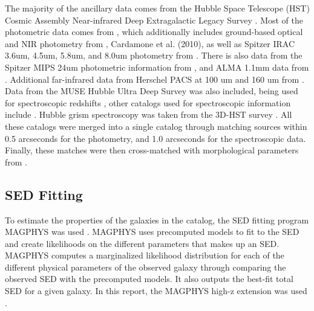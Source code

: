 The majority of the ancillary data comes from the Hubble Space Telescope (HST) Cosmic Assembly Near-infrared Deep Extragalactic Legacy Survey \cite{grogin2011candels, Koekemoer_2011}. Most of the photometric data comes from \cite{skelton20143d}, which additionally includes ground-based optical and NIR photometry from \cite{nonino2009deep, hildebrandt2006gabods, erben2005gabods, retzlaff2010great, Hsieh_2012, 2008ApJ...682..985W}, Cardamone et al. (2010), as well as Spitzer IRAC 3.6um, 4.5um, 5.8um, and 8.0um photometry from \cite{dickinson2003evolution, elbaz2011goods, 2013ApJ...769...80A}. There is also data from the Spitzer MIPS 24um photometric information from \cite{Whitaker_2014}, and ALMA 1.1mm data from \cite{franco2018goods}. Additional far-infrared data from Herschel PACS at 100 um and 160 um from \cite{elbaz2011goods}. Data from the MUSE Hubble Ultra Deep Survey \cite{bacon2017} was also included, being used for spectroscopic redshifts \cite{inami2017}, other catalogs used for spectroscopic information include \cite{le2005vimos, coe2006galaxies, skelton20143d, morris2015wfc3}. Hubble grism spectroscopy was taken from the 3D-HST survey \cite{momcheva20163d}.  All these catalogs were merged into a single catalog through matching sources within 0.5 arcseconds for the photometry, and 1.0 arcseconds for the spectroscopic data. Finally, these matches were then cross-matched with morphological parameters from \cite{van2012structural}.




\subsection{SED Fitting}

To estimate the properties of the galaxies in the catalog, the SED fitting program MAGPHYS was used \cite{da2008simple, da2015alma}. MAGPHYS uses precomputed models to fit to the SED and create likelihoods on the different parameters that makes up an SED. MAGPHYS computes a marginalized likelihood distribution for each of the different physical parameters of the observed galaxy through comparing the observed SED with the precomputed models. It also outputs the best-fit total SED for a given galaxy. In this report, the MAGPHYS high-z extension was used \cite{da2015alma}.

